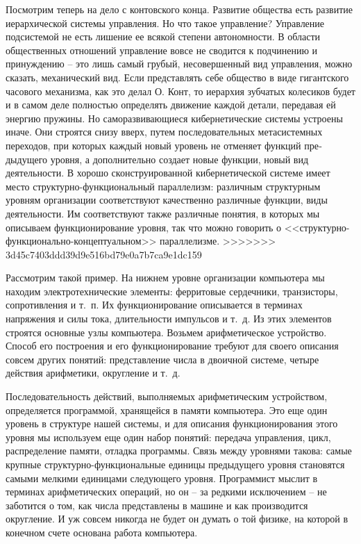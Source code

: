 \documentclass{book}
\begin{document}
Посмотрим теперь на дело с контовского конца. Развитие общества есть развитие иерархической системы управления. Но что такое управление? Управление подсистемой не есть лишение ее всякой степени автономности. В области общест­венных отношений управление вовсе не сводится к подчинению и принуждению -- это лишь самый грубый, несовершенный вид управления, можно сказать, механический вид.  Если представ­лять себе общество в виде гигантского часового механизма, как это делал О. Конт, то иерархия зубчатых колесиков будет и в самом деле полностью определять движение каждой детали, передавая ей энергию пружины. Но саморазвивающиеся ки­бернетические системы устроены иначе. Они строятся снизу вверх, путем последовательных метасистемных переходов, при которых каждый новый уровень не отменяет функций пре­дыдущего уровня, а дополнительно создает новые функции, новый вид деятельности. В хорошо сконструированной кибер­нетической системе имеет место структурно-функциональный параллелизм:  различным структурным уровням 
организации соответствуют качественно различные функции, виды деятель­ности. Им соответствуют также различные понятия, в которых мы описываем функционирование уровня, так что можно гово­рить о <<структурно-функционально-концептуальном>> паралле­лизме.
>>>>>>> 3d45c7403ddd39d9e516bd79e0a7b7ca9e1dc159

Рассмотрим такой пример. На нижнем уровне организации компьютера мы находим электротехнические элементы: ферритовые сердечники, транзисторы, сопротивления и т.~п. Их функционирование описывается в терминах напряжения и си­лы тока, длительности импульсов и т.~д. Из этих элементов строятся основные узлы компьютера. Возьмем арифметическое устройство. Способ его построения и его функционирова­ние требуют для своего описания совсем других понятий: пред­ставление числа в двоичной системе, четыре действия арифметики, округление и т.~д.

Последовательность действий, выполняемых арифметическим устройством, определяется программой, хранящейся в памяти компьютера. Это еще один уровень в структуре нашей системы, и для описания функционирования этого уровня мы использу­ем еще один набор понятий: передача управления, цикл, распределение памяти, отладка программы. Связь между уровнями такова: самые крупные структурно-функциональные единицы предыдущего уровня становятся самыми мелкими единицами следующего уровня. Программист мыслит в терминах арифметических операций, но он -- за редкими исключением -- не заботится о том, как числа представлены в машине и как производится округление. И уж совсем никогда не будет он думать о той физике, на которой в конечном счете основана работа компьютера.
\end{document}
